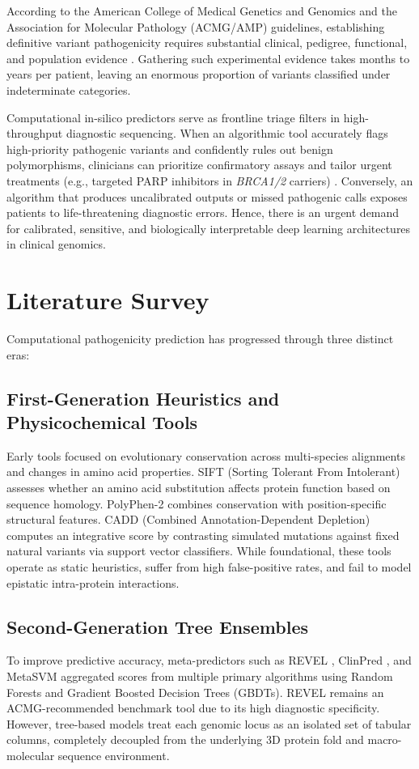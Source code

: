 \documentclass[conference]{IEEEtran}
\begin{document}
According to the American College of Medical Genetics and Genomics and the Association for Molecular Pathology (ACMG/AMP) guidelines, establishing definitive variant pathogenicity requires substantial clinical, pedigree, functional, and population evidence \cite{richards2015standards}. Gathering such experimental evidence takes months to years per patient, leaving an enormous proportion of variants classified under indeterminate categories.

Computational in-silico predictors serve as frontline triage filters in high-throughput diagnostic sequencing. When an algorithmic tool accurately flags high-priority pathogenic variants and confidently rules out benign polymorphisms, clinicians can prioritize confirmatory assays and tailor urgent treatments (e.g., targeted PARP inhibitors in \textit{BRCA1/2} carriers) \cite{landrum2020clinvar}. Conversely, an algorithm that produces uncalibrated outputs or missed pathogenic calls exposes patients to life-threatening diagnostic errors. Hence, there is an urgent demand for calibrated, sensitive, and biologically interpretable deep learning architectures in clinical genomics.

\section{Literature Survey}
Computational pathogenicity prediction has progressed through three distinct eras:

\subsection{First-Generation Heuristics and Physicochemical Tools}
Early tools focused on evolutionary conservation across multi-species alignments and changes in amino acid properties. SIFT (Sorting Tolerant From Intolerant) \cite{ng2003sift} assesses whether an amino acid substitution affects protein function based on sequence homology. PolyPhen-2 \cite{adzhubei2010method} combines conservation with position-specific structural features. CADD (Combined Annotation-Dependent Depletion) \cite{rentzsch2019cadd} computes an integrative score by contrasting simulated mutations against fixed natural variants via support vector classifiers. While foundational, these tools operate as static heuristics, suffer from high false-positive rates, and fail to model epistatic intra-protein interactions.

\subsection{Second-Generation Tree Ensembles}
To improve predictive accuracy, meta-predictors such as REVEL \cite{ioannidis2016revel}, ClinPred \cite{alirezaie2018clinpred}, and MetaSVM \cite{dong2015comparison} aggregated scores from multiple primary algorithms using Random Forests and Gradient Boosted Decision Trees (GBDTs). REVEL remains an ACMG-recommended benchmark tool due to its high diagnostic specificity. However, tree-based models treat each genomic locus as an isolated set of tabular columns, completely decoupled from the underlying 3D protein fold and macro-molecular sequence environment.
\end{document}
